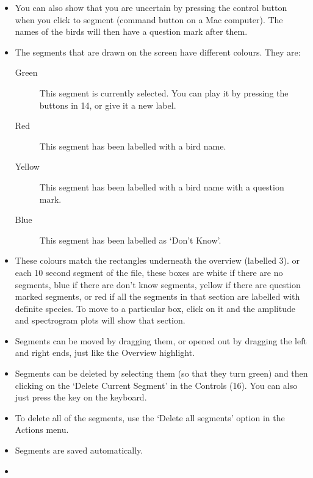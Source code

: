 \documentclass{article}
\begin{document}
\begin{itemize}
\item You can also show that you are uncertain by pressing the control button when you click to segment (command button on a Mac computer). The names of the birds will then have a question mark after them. 

\item The segments that are drawn on the screen have different colours. They are:
	\begin{description} 
	\item[Green] This segment is currently selected. You can play it by pressing the buttons in 14, or give it a new label. 
	\item[Red] This segment has been labelled with a bird name.
	\item[Yellow] This segment has been labelled with a bird name with a question mark.
	\item[Blue] This segment has been labelled as `Don't Know'.
	\end{description}

\item These colours match the rectangles underneath the overview (labelled 3). or each 10 second segment of the file, these boxes are white if there are no segments, blue if there are don't know segments, yellow if there are question marked segments, or red if all the segments in that section are labelled with definite species. To move to a particular box, click on it and the amplitude and spectrogram plots will show that section. 

\item Segments can be moved by dragging them, or opened out by dragging the left and right ends, just like the Overview highlight. 

\item Segments can be deleted by selecting them (so that they turn green) and then clicking on the `Delete Current Segment' in the Controls (16). You can also just press the  key on the keyboard. 

\item To delete all of the segments, use the `Delete all segments' option in the Actions menu. 

\item Segments are saved automatically. 

\item {}
\end{itemize}
\end{document}
